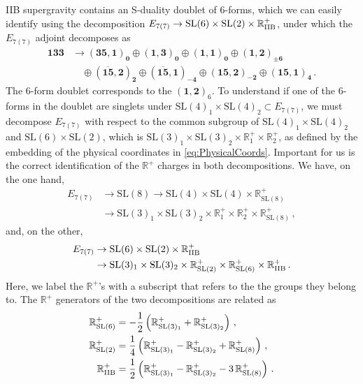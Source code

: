 \documentclass[a4paper, 11pt]{article}
\numberwithin{equation}{section}
\newcommand{\SL}[1]{\mathrm{SL}( #1 )}
\newcommand{\En}[1]{E_{#1(#1)}}
\newcommand{\+}{\oplus}
\begin{document}
IIB supergravity contains an S-duality doublet of 6-forms, which we can easily identify using the decomposition $\En{7} \rightarrow \SL{6} \times \SL{2} \times \mathbb{R}^+_{\rm IIB}$, under which the $\En{7}$ adjoint decomposes as
\begin{equation} \label{eq:AdjointSL6}
	\begin{split}
		\mathbf{133} &\rightarrow \mathbf{\left(35,1\right)_0} \oplus \mathbf{\left(1,3\right)_0} \oplus \mathbf{\left(1,1\right)_0} \oplus \mathbf{\left(1,2\right)_{\pm 6}} \\
		& \quad \oplus \mathbf{\left(\overline{15},2\right)_2} \oplus \mathbf{\left(\overline{15},1\right)_{-4}} \oplus \mathbf{\left(15,2\right)_{-2}} \oplus \mathbf{\left(15,1\right)_4} \,.
	\end{split}
\end{equation}
The 6-form doublet corresponds to the $\mathbf{\left(1,2\right)}_{6}$. To understand if one of the 6-forms in the doublet are singlets under $\SL{4}_1 \times \SL{4}_2 \subset \En{7}$, we must decompose $\En{7}$ with respect to the common subgroup of $\SL{4}_1 \times \SL{4}_2$ and $\SL{6} \times \SL{2}$, which is $\SL{3}_1 \times \SL{3}_2 \times \mathbb{R}^+_1 \times \mathbb{R}^+_2$, as defined by the embedding of the physical coordinates in \eqref{eq:PhysicalCoords}. Important for us is the correct identification of the $\mathbb{R}^+$ charges in both decompositions. We have, on the one hand,
\begin{equation} \label{eq:SL4SL4}
	\begin{split}
		\En{7} &\rightarrow \SL{8} \rightarrow \SL{4} \times \SL{4} \times \mathbb{R}^+_{\SL{8}} \\
		&\rightarrow \SL{3}_1 \times \SL{3}_2 \times \mathbb{R}^+_1 \times \mathbb{R}^+_2 \times \mathbb{R}^+_{\SL{8}} \,,
	\end{split}
\end{equation}
and, on the other,
\begin{equation} \label{eq:SL6SL2}
	\begin{split}
		\En{7} &\rightarrow \SL{6} \times \SL{2} \times \mathbb{R}^+_{\rm IIB} \\
		&\rightarrow \SL{3}_1 \times \SL{3}_2 \times \mathbb{R}^+_{\SL{2}} \times \mathbb{R}^+_{\SL{6}} \times \mathbb{R}^+_{\rm IIB} \,.
	\end{split}
\end{equation}
Here, we label the $\mathbb{R}^+$'s with a subscript that refers to the the groups they belong to. The $\mathbb{R}^+$ generators of the two decompositions are related as
\begin{equation} \label{eq:R+charges}
	\begin{split}
		\mathbb{R}^+_{\SL{6}} &= - \frac12 \left( \mathbb{R}^+_{\SL{3}_1} + \mathbb{R}^+_{\SL{3}_2} \right) \,, \\
		\mathbb{R}^+_{\SL{2}} &= \frac14 \left( \mathbb{R}^+_{\SL{3}_1} - \mathbb{R}^+_{\SL{3}_2} + \mathbb{R}^+_{\SL{8}} \right) \,, \\
		\mathbb{R}^+_{\rm IIB} &= \frac12 \left( \mathbb{R}^+_{\SL{3}_1} - \mathbb{R}^+_{\SL{3}_2} - 3\, \mathbb{R}^+_{\SL{8}} \right) \,.
	\end{split}
\end{equation}
\end{document}
